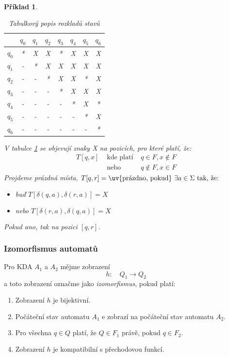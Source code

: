 \documentclass[10pt,a4paper]{article}
\theoremstyle{note}
\newtheorem{priklad}{Příklad}
\begin{document}
\begin{priklad}
\vspace*{30px}
\begin{table}[h]
\begin{center}
\begin{tabular}{c||c|c|c|c|c|c|c}
& $q_0$ & $q_1$ & $q_2$ & $q_3$ & $q_4$ & $q_5$ & $q_6$ \\
\hline
$q_0$ & * & X & X & * & X & X & X \\
\hline
$q_1$ & - & * & X & X & X & X & X \\
\hline
$q_2$ & - & - & * & X & X & * & X \\
\hline
$q_3$ & - & - & - & * & X & X & X \\
\hline
$q_4$ & - & - & - & - & * & X & * \\
\hline
$q_5$ & - & - & - & - & - & * & X \\
\hline
$q_6$ & - & - & - & - & - & - & * \\
\end{tabular}
\end{center}
\caption{Tabulkový popis rozkladů stavů}\label{tabulka-x}
\end{table}
V tabulce \ref{tabulka-x} se objevují znaky \textit{X} na pozicích, pro které platí, že:
\begin{eqnarray*}
T[q,x] &\text{ kde platí }& q \in F, x \notin F \\
&\text{ nebo }& q \notin F, x \in F
\end{eqnarray*}
Projdeme pr\'azdn\'a m\'ista, $T[q,r] = \text{\uv{pr\'azdno, pokud} } \exists a \in \Sigma \text{ tak, že:}$
\begin{itemize}
\item
buď $T[\delta(q,a),\delta(r,a)] = X$
\item
nebo $T[\delta(r,a),\delta(q,a)] = X$
\end{itemize}
Pokud ano, tak  na pozici $[q,r]$.
\end{priklad}

\subsubsection{Izomorfismus automatů}
Pro KDA $A_1$ a $A_2$ mějme zobrazen\'i
$$
h: \quad Q_1 \rightarrow Q_2
$$
a toto zobrazení označme jako \textit{izomorfismus}, pokud platí:
\begin{enumerate}
\item
Zobrazení $h$ je bijektivní.
\item
Počáteční stav automatu $A_1$ e zobrazí na počáteční stav automatu $A_2$.
\item
Pro všechna $q \in Q$ platí, že $Q \in F_1$ právě, pokud $q \in F_2$.
\item
Zobrazení $h$ je kompatibilní s přechodovou funkcí.
\end{enumerate}
\end{document}
